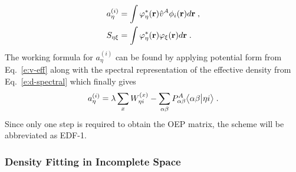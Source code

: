 \documentclass[aip,jcp,amsmath,amssymb,reprint,floatfix]{revtex4-1}
\begin{document}
%
\begin{subequations}
\begin{align}
 a^{(i)}_\eta &= \int \varphi^*_\eta({\bf r}) \hat{v}^A \phi_i({\bf r}) d{\bf r} \;,\\  
 S_{\eta\xi}  &= \int \varphi^*_\eta({\bf r}) \varphi_\xi({\bf r}) d{\bf r} \;.
\end{align}
\end{subequations}
%
%
The working formula for $a^{(i)}_\eta$ can be found by applying 
potential form from Eq.~\eqref{e:v-eff}
along with the spectral representation of the effective density from Eq.~\eqref{e:d-spectral} 
which finally gives
%
\begin{equation} \label{e:a-coeff-compl}
 a^{(i)}_\eta = \lambda \sum_{x} W_{\eta i}^{(x)} - 
 \sum_{\alpha\beta} P^A_{\alpha\beta} 
  \bigl\langle {\alpha\beta} \bigl\lvert {\eta i} \bigr\rangle \;.
\end{equation}
%
Since only one step is required to obtain the OEP matrix, the scheme will
be abbreviated as EDF-1.

\subsubsection{\label{sss:2.3.1.GDF-2}Density Fitting in Incomplete Space}
\end{document}
